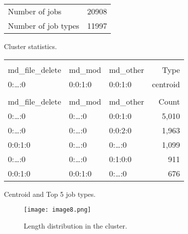 \documentclass{jhps}
\begin{document}
\noindent\begin{minipage}{\textwidth}
\captionsetup{type=table}

\begingroup
  \begin{subtable}{\textwidth}
  \centering
  \begin{tabular}{ll}
    Number of jobs & 20908 \\
    Number of job types & 11997 \\
  \end{tabular}
  \caption{Cluster statistics.}
  \label{tab:hex_native:stats}
  \end{subtable}
\endgroup

\medskip

\begingroup
  \begin{subtable}{\textwidth}
  \centering
  \begin{tiny}
    \begin{tabular}{@{ }l@{ }@{ }l@{ }@{ }l@{ }|@{ }r@{ }}
      \rowcolor{tabhcolor}
      \multicolumn{3}{@{ }l|@{ }}{Hexadecimal coding} &            \\
      \rowcolor{tabhcolor}
      md\_file\_delete     &  md\_mod   & md\_other & Type     \\
      \hline
      0:\dots:0            &  0:0:1:0   & 0:0:1:0   & centroid \\
      \multicolumn{4}{l}{} \\
      \rowcolor{tabhcolor}
      md\_file\_delete     &  md\_mod   & md\_other & Count    \\
      \hline
      0:\dots:0            &  0:\dots:0 & 0:0:1:0   & 5,010    \\
      0:\dots:0            &  0:\dots:0 & 0:0:2:0   & 1,963    \\
      0:0:1:0              &  0:\dots:0 & 0:\dots:0 & 1,099    \\
      0:\dots:0            &  0:\dots:0 & 0:1:0:0   & 911      \\
      0:0:1:0              &  0:0:1:0   & 0:\dots:0 & 676      \\
    \end{tabular}
  \end{tiny}
  \caption{Centroid and Top 5 job types.}
  \label{tab:hex_native:top_jobs}
  \end{subtable}
\endgroup

\medskip

\begingroup
  \begin{subfigure}{\textwidth}
  \centering
  \texttt{[image: image8.png]}
  \caption{Length distribution in the cluster.}
  \label{fig:hex_native:length}
  \end{subfigure}
\endgroup

\label{fig:hex_native}
\end{minipage}
\end{document}
